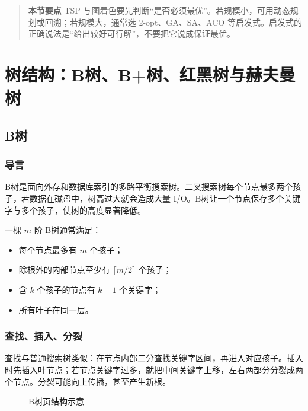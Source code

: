 \documentclass[UTF8,oneside,12pt]{ctexbook}
\newenvironment{summarybox}{\begin{quote}\small\noindent\textbf{本节要点}\quad}{\end{quote}}
\begin{document}
\begin{summarybox}
TSP 与图着色要先判断“是否必须最优”。若规模小，可用动态规划或回溯；若规模大，通常选 2-opt、GA、SA、ACO 等启发式。启发式的正确说法是“给出较好可行解”，不要把它说成保证最优。
\end{summarybox}

\chapter{树结构：B树、B+树、红黑树与赫夫曼树}
\section{B树}
\subsection{导言}
B树是面向外存和数据库索引的多路平衡搜索树。二叉搜索树每个节点最多两个孩子，若数据在磁盘中，树高过大就会造成大量 I/O。B树让一个节点保存多个关键字与多个孩子，使树的高度显著降低。

一棵 $m$ 阶 B树通常满足：
\begin{itemize}
  \item 每个节点最多有 $m$ 个孩子；
  \item 除根外的内部节点至少有 $\lceil m/2\rceil$ 个孩子；
  \item 含 $k$ 个孩子的节点有 $k-1$ 个关键字；
  \item 所有叶子在同一层。
\end{itemize}

\subsection{查找、插入、分裂}
查找与普通搜索树类似：在节点内部二分查找关键字区间，再进入对应孩子。插入时先插入叶节点；若节点关键字过多，就把中间关键字上移，左右两部分分裂成两个节点。分裂可能向上传播，甚至产生新根。

\begin{figure}[htbp]
\centering
{}
\caption{B树页结构示意}
\end{figure}
\end{document}
